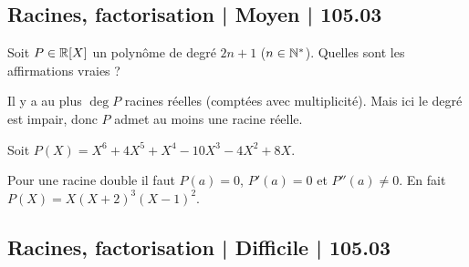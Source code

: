 \subsection{Racines, factorisation | Moyen | 105.03}


\begin{question}
Soit $P \in \mathbb{R}[X]$ un polynôme de degré $2n+1$ ($n\in\mathbb{N}^*$).
Quelles sont les affirmations vraies ?
\begin{answers}



\end{answers}
\begin{explanations}
Il y a au plus $\deg P$ racines réelles (comptées avec multiplicité). Mais ici le degré est impair, donc $P$ admet au moins une racine réelle.
\end{explanations}
\end{question}


\begin{question}
Soit $P(X) = X^6 + 4 X^5 + X^4 - 10 X^3 - 4 X^2 + 8 X$.
\begin{answers}



\end{answers}
\begin{explanations}
Pour une racine double il faut $P(a)=0$, $P'(a)=0$ et $P''(a)\neq0$.
En fait $P(X) = X(X+2)^3(X-1)^2$.
\end{explanations}
\end{question}




\subsection{Racines, factorisation | Difficile | 105.03}


